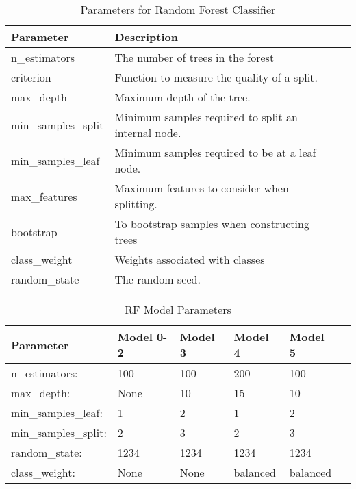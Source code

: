 \begin{table}[h]
\centering
\caption{Parameters for Random Forest Classifier \parencite{scikit-learn}}
\label{tab:rf-params}
\begin{tabular}{|l|l|l|}
\hline
\textbf{Parameter} & \textbf{Description} \\ \hline
n\_estimators & The number of trees in the forest\\
criterion & Function to measure the quality of a split.\\
max\_depth & Maximum depth of the tree. \\
min\_samples\_split & Minimum samples required to split an internal node. \\ 
min\_samples\_leaf & Minimum samples required to be at a leaf node. \\
max\_features & Maximum features to consider when splitting. \\
bootstrap & To bootstrap samples when constructing trees \\
class\_weight & Weights associated with classes \\
random\_state & The random seed.\\ \hline
\end{tabular}
\end{table}

\begin{table}[H]
\centering
\caption{RF Model Parameters}
\label{tab:rf-parameters}
\begin{tabular}{llllll}
\hline
Parameter & Model 0-2 & Model 3 & Model 4 & Model 5\\ \hline
n\_estimators: & 100 & 100 & 200 & 100\\
max\_depth: & None & 10 & 15 & 10  \\
min\_samples\_leaf: & 1 & 2 & 1 & 2 \\
min\_samples\_split: & 2 & 3 & 2 & 3 \\
random\_state: & 1234 & 1234 & 1234 & 1234 \\
class\_weight: & None & None & balanced & balanced \\ \hline
\end{tabular}
\end{table}

